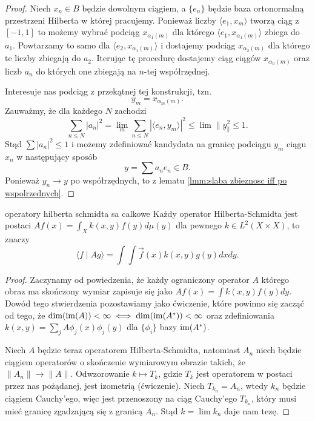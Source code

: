 \begin{proof}
  Niech $x_n\in B$ będzie dowolnym ciągiem, a $\{e_n\}$ będzie baza ortonormalną przestrzeni Hilberta w której pracujemy. Ponieważ liczby $\langle e_1, x_m\rangle$ tworzą ciąg z $[-1, 1]$ to możemy wybrać podciąg $x_{\alpha_1(m)}$ dla którego $\langle e_1, x_{\alpha_1(m)}\rangle$ zbiega do $a_1$. Powtarzamy to samo dla $\langle e_2, x_{\alpha_1(m)}\rangle$ i dostajemy podciąg $x_{\alpha_2(m)}$ dla którego te liczby zbiegają do $a_2$. Iterując tę procedurę dostajemy ciąg ciągów $x_{\alpha_n(m)}$ oraz liczb $a_n$ do których one zbiegają na $n$-tej współrzędnej. 

  Interesuje nas podciąg z przekątnej tej konstrukcji, tzn. 
  $$y_m=x_{\alpha_m(m)}.$$
  Zauważmy, że dla każdego $N$ zachodzi
  $$\sum_{n\leq N}|a_n|^2=\lim_m\sum_{n\leq N}|\langle e_n,y_m\rangle|^2\leq \lim\|y_\|^2\leq 1.$$
  Stąd $\sum |a_n|^2\leq 1$ i możemy zdefiniować kandydata na granicę podciągu $y_m$ ciągu $x_n$ w następujący sposób
  $$y=\sum a_n e_n\in B.$$
  Ponieważ $y_n\to y$ po współrzędnych, to z lematu \ref{lmm:slaba zbieznosc iff po wspolrzednych}.
\end{proof}

\begin{theorem}{}{operatory hilberta schmidta sa calkowe}
    Każdy operator Hilberta-Schmidta jest postaci $Af(x)=\int_X k(x,y)f(y)d\mu(y)$ dla pewnego $k\in L^2(X\times X)$, to znaczy
    $$\langle f\;|\;Ag\rangle=\int\int \vec{f}(x)k(x,y)g(y)dxdy.$$
\end{theorem}


\begin{proof}
  Zaczynamy od powiedzenia, że każdy ograniczony operator $A$ którego obraz ma skończony wymiar zapisuje się jako $Af(x)=\int k(x,y)f(y)dy$. Dowód tego stwierdzenia pozostawiamy jako ćwiczenie, które powinno się zacząć od tego, że $\dim(\operatorname{im}(A))<\infty\iff\dim(\operatorname{im}(A^*))<\infty$ oraz zdefiniowania $k(x,y)=\sum_jA\phi_j(x)\phi_j(y)$ dla $\{\phi_i\}$ bazy $\operatorname{im}(A^*)$.

    Niech $A$ będzie teraz operatorem Hilberta-Schmidta, natomiast $A_n$ niech będzie ciągiem operatorów o skończenie wymiarowym obrazie takich, że $\|A_n\|\to \|A\|$. Odwzorowanie $k\mapsto T_k$, gdzie $T_k$ jest operatorem w postaci przez nas pożądanej, jest izometrią (ćwiczenie). Niech $T_{k_n}=A_n$, wtedy $k_n$ będzie ciągiem Cauchy'ego, więc jest przenoszony na ciąg Cauchy'ego $T_{k_n}$, który musi mieć granicę zgadzającą się z granicą $A_n$. Stąd $k=\lim k_n$ daje nam tezę.
\end{proof}

